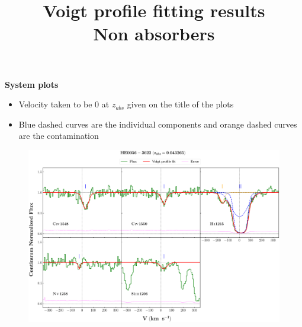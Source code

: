 \documentclass[12pt,draft]{report}
\title{\textbf{Voigt profile fitting results} \\ 
 {Non \ion{O}{vi} absorbers}}
\begin{document}
\maketitle

\textbf{System plots} 

\begin{itemize}
    \item Velocity taken to be 0 at $z_{abs}$ given on the title of the plots
    \item Blue dashed curves are the individual components and orange dashed curves are the contamination
\end{itemize}


\newpage

\begin{landscape}

\begin{figure}
    \centering
    \vspace{-20mm}
    \hspace*{-35mm}
    \includegraphics[width=1.25\linewidth]{System-Plots/HE0056-3622_z=0.043265_sys_plot.png}
\end{figure}

\end{landscape}
\end{document}
